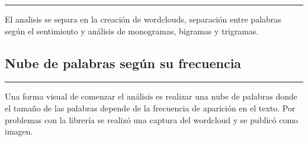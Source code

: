 \documentclass[
]{article}
\begin{document}
\begin{center}\rule{0.5\linewidth}{0.5pt}\end{center}

El analisis se separa en la creación de wordclouds, separación entre
palabras según el sentimiento y análisis de monogramas, bigramas y
trigramas.

\hypertarget{nube-de-palabras-seguxfan-su-frecuencia}{%
\subsection{\texorpdfstring{\textbf{Nube de palabras según su
frecuencia}}{Nube de palabras según su frecuencia}}\label{nube-de-palabras-seguxfan-su-frecuencia}}

\begin{center}\rule{0.5\linewidth}{0.5pt}\end{center}

Una forma visual de comenzar el análisis es realizar una nube de
palabras donde el tamaño de las palabras depende de la frecuencia de
aparición en el texto. Por problemas con la librería se realizó una
captura del wordcloud y se publicó como imagen.
\end{document}
